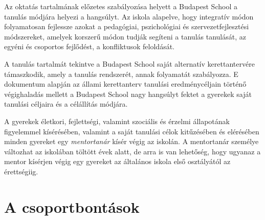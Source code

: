 
Az oktatás tartalmának előzetes szabályozása helyett a Budapest School a
tanulás módjára helyezi a hangsúlyt. Az iskola alapelve,
hogy
integratív módon folyamatosan fejlessze azokat a pedagógiai, pszichológiai és
szervezetfejlesztési módszereket,
amelyek korszerű módon tudják segíteni a tanulás tanulását, az egyéni és
csoportos fejlődést, a konfliktusok feloldását.

A tanulás tartalmát tekintve a Budapest School saját alternatív
kerettantervére támaszkodik, amely a tanulás rendszerét, annak
folyamatát szabályozza. E dokumentum alapján az állami kerettanterv
tanulási eredménycéljain történő végighaladás mellett a Budapest School
nagy hangsúlyt fektet a gyerekek saját tanulási céljaira és a
célállítás módjára.

A gyerekek életkori, fejlettségi, valamint szociális és érzelmi
állapotának figyelemmel kísérésében, valamint a saját tanulási célok
kitűzésében és elérésében minden gyereket egy \emph{mentortanár} kísér végig
az iskolán. A mentortanár személye változhat
az iskolában töltött évek
alatt, de arra is van lehetőség, hogy ugyanaz a mentor kísérjen végig
egy gyereket az általános iskola első osztályától az érettségiig.




\section{A csoportbontások}
\label{sec:csoportbontasok}

